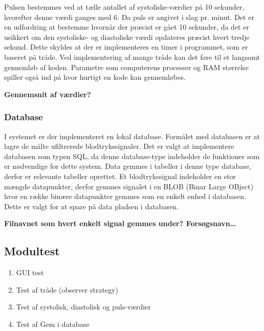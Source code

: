 Pulsen bestemmes ved at tælle antallet af systoliske-værdier på 10 sekunder, hvorefter denne værdi ganges med 6. Da puls er angivet i slag pr. minut. Det er en udfordring at bestemme hvornår der præcist er gået 10 sekunder, da det er usikkert om den systoliske- og diastoliske værdi opdateres præcist hvert tredje sekund. Dette skyldes at der er implementeres en timer i programmet, som er baseret på tråde. Ved implementering af mange tråde kan det føre til et langsomt gennemløb af koden. Parametre som computerens processer og RAM størrelse spiller også ind på hvor hurtigt en kode kan gennemløbes. 

\textbf{Gennemsnit af værdier?}

\subsubsection{Database}
I systemet er der implementeret en lokal database. Formålet med databasen er at lagre de målte ufiltrerede blodtrykssignaler. Det er valgt at implementere databasen som typen SQL, da denne database-type indeholder de funktioner som er nødvendige for dette system. Data gemmes i tabeller i denne type database, derfor er relevante tabeller oprettet. Et blodtrykssignal indeholder en stor mængde datapunkter, derfor gemmes signalet i en BLOB (Binar Large OBject) hvor en række binære datapunkter gemmes som en enkelt enhed i databasen. Dette er valgt for at spare på data pladsen i databasen. 

\textbf{Filnavnet som hvert enkelt signal gemmes under? Forsøgsnavn…}

\subsection{Modultest}
\begin{enumerate}
\item GUI test
\item Test af tråde (observer strategy)
\item Test af systolisk, diastolisk og puls-værdier
\item Test af Gem i database
\end{enumerate}